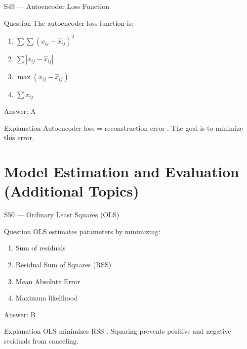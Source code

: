 \documentclass[aspectratio=169,8pt]{beamer}
\begin{document}
	\begin{frame}{S49 --- Autoencoder Loss Function}
		\begin{block}{Question}
			The autoencoder loss function is:
			\begin{enumerate}
				\item $\sum \sum (x_{ij} - \hat{x}_{ij})^2$
				\item $\sum |x_{ij} - \hat{x}_{ij}|$
				\item $\max(x_{ij} - \hat{x}_{ij})$
				\item $\sum x_{ij}$
			\end{enumerate}
		\end{block}
		\begin{exampleblock}{Answer: A}\end{exampleblock}
		\begin{block}{Explanation}
			Autoencoder loss = reconstruction error . The goal is to minimize this error.
		\end{block}
	\end{frame}
	
	\section{Model Estimation and Evaluation (Additional Topics)}
	
	\begin{frame}{S50 --- Ordinary Least Squares (OLS)}
		\begin{block}{Question}
			OLS estimates parameters by minimizing:
			\begin{enumerate}
				\item Sum of residuals
				\item Residual Sum of Squares (RSS)
				\item Mean Absolute Error
				\item Maximum likelihood
			\end{enumerate}
		\end{block}
		\begin{exampleblock}{Answer: B}\end{exampleblock}
		\begin{block}{Explanation}
			OLS minimizes RSS  . Squaring prevents positive and negative residuals from canceling.
		\end{block}
	\end{frame}
	
\end{document}
